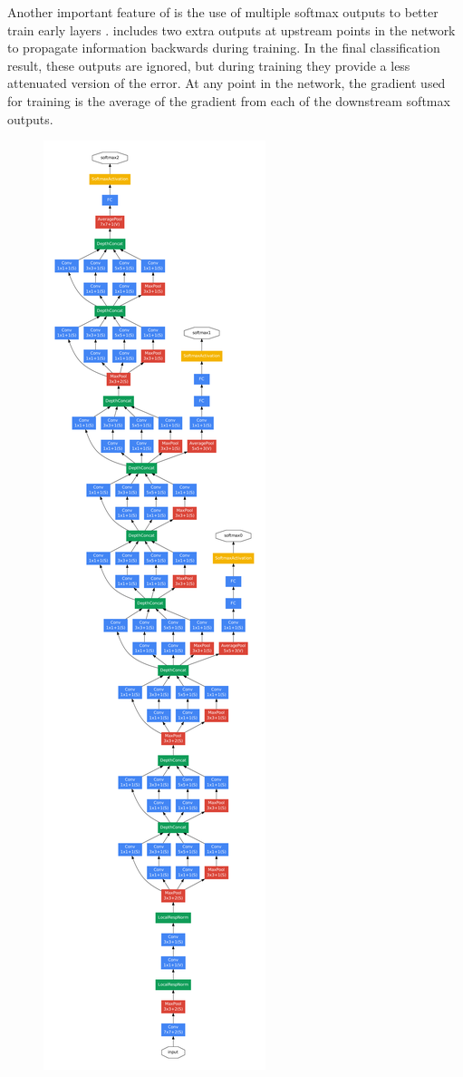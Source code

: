 Another important feature of \googlenet is the use of multiple softmax outputs to better train early layers \cite{szegedy2014going}.
\googlenet includes two extra outputs at upstream points in the network to propagate information backwards during training.
In the final classification result, these outputs are ignored, but during training they provide a less attenuated version of the error.
At any point in the network, the gradient used for training is the average of the gradient from each of the downstream softmax outputs.

\begin{figure}[t]
  \begin{center}
    \includegraphics[height=\textheight]{figures/figures/inceptionoverall.pdf}

\end{center}
\end{figure}
